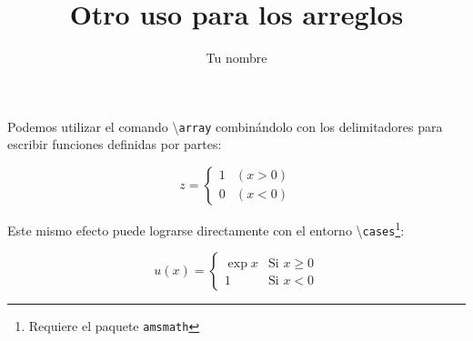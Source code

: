 \documentclass[12pt,letterpaper]{article}
\author{Tu nombre}
\title{Otro uso para los arreglos}
\begin{document}
\maketitle

Podemos utilizar el comando \textbackslash\texttt{array} combinándolo con los delimitadores para escribir funciones definidas por partes:

\[ 
z = \left\{
              \begin{array}{ll}
                   1 & (x>0)\\
                   0 & (x<0)
              \end{array}
     \right.
\] %

Este mismo efecto puede lograrse directamente con el entorno \textbackslash\texttt{cases}\footnote{Requiere el paquete \texttt{amsmath}}:

\[
 u(x) =
  \begin{cases}
   \exp{x} & \text{Si } x\geq0 \\
   1       & \text{Si } x < 0
  \end{cases}
\]
\end{document}
